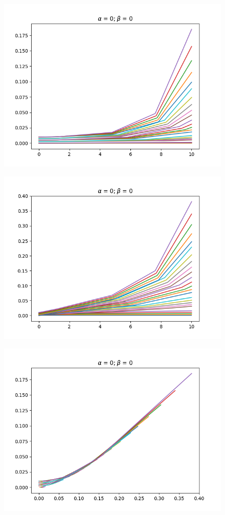 \documentclass{article}
\begin{document}
    \begin{figure}[ht]
        \centering
        \begin{minipage}{.5\textwidth}
            \centering
            \includegraphics[width=0.8\linewidth]{pktyZerowea=0_b=0_X.png}
            \label{fig:test11}
        \end{minipage}%
        \begin{minipage}{.5\textwidth}
            \centering
            \includegraphics[width=.8\linewidth]{pktyZerowea=0_b=0_Y.png}
            \label{fig:test12}
        \end{minipage}
        \centering
        \begin{minipage}{.5\textwidth}
            \centering
            \includegraphics[width=0.8\linewidth]{pktyZerowea=0_b=0_XY.png}

\end{minipage}
\end{figure}
\end{document}
